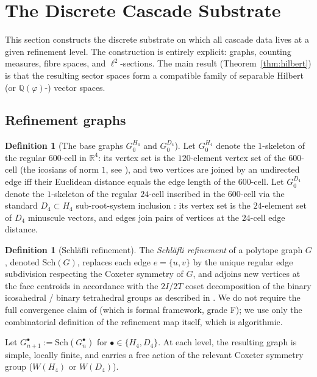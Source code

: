 \documentclass[11pt, a4paper]{amsart}
\theoremstyle{definition}
\newtheorem{definition}[theorem]{Definition}
\newcommand{\R}{\mathbb{R}}
\newcommand{\Q}{\mathbb{Q}}
\newcommand{\pphi}{\varphi}
\begin{document}
\section{The Discrete Cascade Substrate}
\label{sec:substrate}

This section constructs the discrete substrate on which all
cascade data lives at a given refinement level. The construction
is entirely explicit: graphs, counting measures, fibre spaces,
and $\ell^2$-sections. The main result (Theorem~\ref{thm:hilbert})
is that the resulting sector spaces form a compatible family of
separable Hilbert (or $\Q(\pphi)$-) vector spaces.

\subsection{Refinement graphs}
\label{subsec:graphs}

\begin{definition}[The base graphs $G_0^{H_4}$ and $G_0^{D_4}$]
\label{def:base-graphs}
Let $G_0^{H_4}$ denote the $1$-skeleton of the regular 600-cell in
$\R^4$: its vertex set is the $120$-element vertex set of the
600-cell (the icosians of norm $1$, see
\cite[\S 3]{CascadeEmbeddings}), and two vertices are joined by an
undirected edge iff their Euclidean distance equals the edge
length of the 600-cell. Let $G_0^{D_4}$ denote the $1$-skeleton of
the regular $24$-cell inscribed in the 600-cell via the standard
$D_4 \subset H_4$ sub-root-system inclusion
\cite[\S 2]{CascadeEmbeddings}: its vertex set is the $24$-element
set of $D_4$ minuscule vectors, and edges join pairs of vertices at
the $24$-cell edge distance.
\end{definition}

\begin{definition}[Schl\"afli refinement]
\label{def:schlafli}
The \emph{Schl\"afli refinement} of a polytope graph $G$, denoted
$\mathrm{Sch}(G)$, replaces each edge $e = \{u, v\}$ by the unique
regular edge subdivision respecting the Coxeter symmetry of $G$, and
adjoins new vertices at the face centroids in accordance with the
$2I/2T$ coset decomposition of the binary icosahedral / binary
tetrahedral groups as described in
\cite[\S C2.bis.1]{CascadeGR}. We do not require the full
convergence claim of \cite[\S C2.bis]{CascadeGR} (which is formal
framework, grade F); we use only the combinatorial definition of
the refinement map itself, which is algorithmic.

Let $G_{n+1}^{\bullet} := \mathrm{Sch}(G_n^{\bullet})$ for
$\bullet \in \{H_4, D_4\}$. At each level, the resulting graph is
simple, locally finite, and carries a free action of the relevant
Coxeter symmetry group ($W(H_4)$ or $W(D_4)$).
\end{definition}
\end{document}

